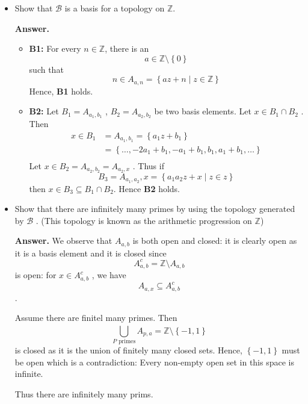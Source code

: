\documentclass{article}
\theoremstyle{remark}
\newcommand{\newpara}
    {
    \vskip 0.4cm
    }
\begin{document}
\begin{itemize}
    \item Show that $\mathscr{B} $ is a basis for a topology on $\mathbb{Z} $.
        \begin{tcolorbox}
            \textbf{Answer.}
            \begin{itemize}
                \item \textbf{B1:}  For every $n \in  \mathbb{Z} $, there is an \[
                        a \in \mathbb{Z} \setminus \left\{ 0 \right\}
                \]
                such that \[
                n \in A_{a,n} = \left\{ az + n  \mid  z \in \mathbb{Z}  \right\}
                \]
                Hence, \textbf{B1} holds.
            \item \textbf{B2:} Let $B_{1} = A_{a_{1},b_{1}}$ , $B_{2} = A_{a_{2}, b_{2}}$  be two basis elements.   Let
                $x \in  B_{1 } \cap B_{2}$ . Then  \[
                    \begin{split}
                x \in B_{1}&  = A_{a_{1}, b_{1}} = \left\{ a_{1} z + b_{1} \right\} \\
                & = \left\{ \ldots, -2a_{1} + b_{1}, -a_{1} + b_{1}, b_{1}, a_{1} + b_{1}, \ldots  \right\} \\
                    \end{split}
                \]
                Let $ x \in  B_{2} = A_{a_{2}, b_{2}} = A_{a_{2}, x}$  . Thus if \[
                B_{3} = A_{a_{1}, a_{2}} , x = \left\{ a_{1} a_{2} z + x  \mid z \in  z \right\}
                \]
                then $x \in  B_{3} \subseteq  B_{1} \cap  B_{2}$. Hence \textbf{B2}  holds.
            \end{itemize}


        \end{tcolorbox}

    \item Show that there are infinitely many primes by using the topology generated by $\mathscr{B} $ . (This topology
        is known as the arithmetic progression on $\mathbb{Z} $)
        \begin{tcolorbox}
            \textbf{Answer.} We observe that $A_{a,b}$  is both open and closed: it is clearly open as it is a basis
            element and it is closed since \[
            A^{c} _{a,b} = \mathbb{Z} \setminus A_{a,b}
            \]
            is open: for $x \in A^{c} _{a,b}$ , we have \[
            A_{a,x} \subseteq  A_{a,b}^{c}
            \] .

            \newpara
            Assume there are finitel many primes. Then \[
            \bigcup_{P \text{ primes}}^{} A_{p,a}  = \mathbb{Z} \setminus \left\{ -1,1 \right\}
            \]
            is closed as it is the union of finitely many closed sets.
            Hence, $\left\{ -1,1 \right\}$  must be open which is a contradiction: Every non-empty open set in this
            space is infinite.


            \newpara
            Thus there are infinitely many prims.

        \end{tcolorbox}
\end{itemize}
\end{document}
